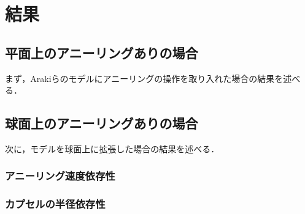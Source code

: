 \chapter{結果}

\section{平面上のアニーリングありの場合}

まず，Arakiらのモデルにアニーリングの操作を取り入れた場合の結果を述べる．

\section{球面上のアニーリングありの場合}

次に，モデルを球面上に拡張した場合の結果を述べる．


\subsection{アニーリング速度依存性}

\subsection{カプセルの半径依存性}
